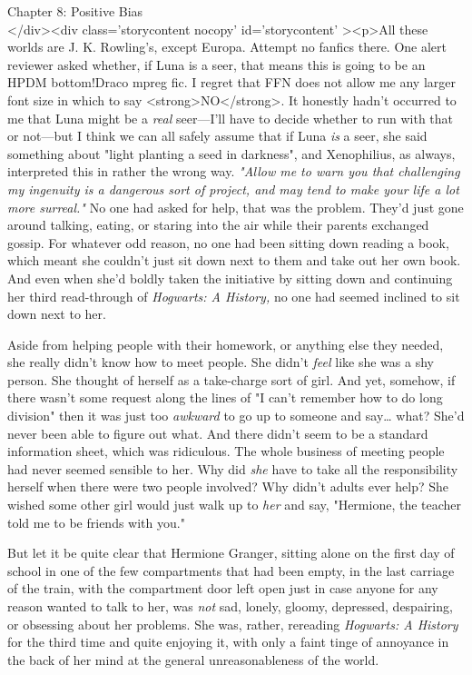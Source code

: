
Chapter 8: Positive Bias\\
</div><div  class='storycontent nocopy' id='storycontent' ><p>All these worlds 
are J. K. Rowling's, except Europa. Attempt no fanfics there.
\sbreak
One alert reviewer asked whether, if Luna is a seer, that means this is going 
to be an HPDM bottom!Draco mpreg fic. I regret that FFN does not allow me any 
larger font size in which to say <strong>NO</strong>. It honestly hadn't 
occurred to me that Luna might be a \emph{real} seer---I'll have to decide 
whether to run with that or not---but I think we can all safely assume that if 
Luna \emph{is} a seer, she said something about "light planting a seed in 
darkness", and Xenophilius, as always, interpreted this in rather the wrong way.
\sbreak
\emph{"Allow me to warn you that challenging my ingenuity is a dangerous sort 
of project, and may tend to make your life a lot more surreal."}
\sbreak
No one had asked for help, that was the problem. They'd just gone around 
talking, eating, or staring into the air while their parents exchanged gossip. 
For whatever odd reason, no one had been sitting down reading a book, which 
meant she couldn't just sit down next to them and take out her own book. And 
even when she'd boldly taken the initiative by sitting down and continuing her 
third read-through of \emph{Hogwarts: A History,} no one had seemed inclined to 
sit down next to her.

Aside from helping people with their homework, or anything else they needed, 
she really didn't know how to meet people. She didn't \emph{feel} like she was 
a shy person. She thought of herself as a take-charge sort of girl. And yet, 
somehow, if there wasn't some request along the lines of "I can't remember how 
to do long division" then it was just too \emph{awkward} to go up to someone 
and say{\ldots} what? She'd never been able to figure out what. And there 
didn't seem to be a standard information sheet, which was ridiculous. The whole 
business of meeting people had never seemed sensible to her. Why did \emph{she} 
have to take all the responsibility herself when there were two people 
involved? Why didn't adults ever help? She wished some other girl would just 
walk up to \emph{her} and say, "Hermione, the teacher told me to be friends 
with you."

But let it be quite clear that Hermione Granger, sitting alone on the first day 
of school in one of the few compartments that had been empty, in the last 
carriage of the train, with the compartment door left open just in case anyone 
for any reason wanted to talk to her, was \emph{not} sad, lonely, gloomy, 
depressed, despairing, or obsessing about her problems. She was, rather, 
rereading \emph{Hogwarts: A History} for the third time and quite enjoying it, 
with only a faint tinge of annoyance in the back of her mind at the general 
unreasonableness of the world.

